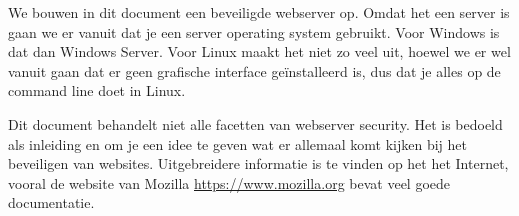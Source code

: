 We bouwen in dit document een beveiligde webserver op. Omdat het een server is gaan we er vanuit dat je een server operating system gebruikt. Voor Windows is dat dan Windows Server. Voor Linux maakt het niet zo veel uit, hoewel we er wel vanuit gaan dat er geen grafische interface ge\"installeerd is, dus dat je alles op de command line doet in Linux.

Dit document behandelt niet alle facetten van webserver security. Het is bedoeld als inleiding en om je een idee te geven wat er allemaal komt kijken bij het beveiligen van websites. Uitgebreidere informatie is te vinden op het het Internet, vooral de website van Mozilla \url{https://www.mozilla.org} bevat veel goede documentatie.
